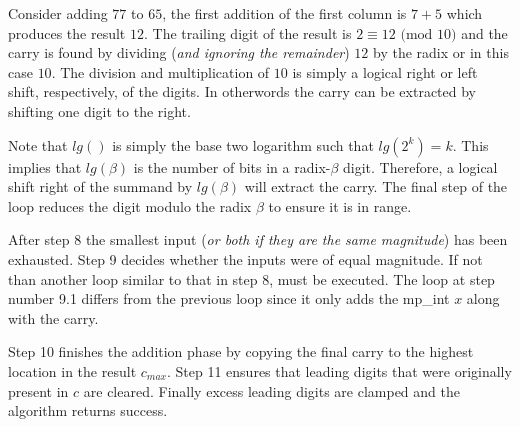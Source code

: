 \documentclass[b5paper]{book}
\begin{document}
Consider adding $77$ to $65$, the first addition of the first column is $7 + 5$ which produces the result $12$.  The trailing digit of the result
is $2 \equiv 12 \mbox{ (mod }10\mbox{)}$ and the carry is found by dividing (\textit{and ignoring the remainder}) $12$ by the radix or in this case $10$.  The
division and multiplication of $10$ is simply a logical right or left shift, respectively, of the digits.  In otherwords the carry can be extracted
by shifting one digit to the right.

Note that $lg()$ is simply the base two logarithm such that $lg(2^k) = k$.  This implies that $lg(\beta)$ is the number of bits in a radix-$\beta$ 
digit.  Therefore, a logical shift right of the summand by $lg(\beta)$ will extract the carry.  The final step of the loop reduces the digit 
modulo the radix $\beta$ to ensure it is in range.

After step 8 the smallest input (\textit{or both if they are the same magnitude}) has been exhausted.  Step 9 decides whether
the inputs were of equal magnitude.  If not than another loop similar to that in step 8, must be executed.  The loop at step
number 9.1 differs from the previous loop since it only adds the mp\_int $x$ along with the carry.  

Step 10 finishes the addition phase by copying the final carry to the highest location in the result $c_{max}$.  Step 11 ensures that 
leading digits that were originally present in $c$ are cleared.  Finally excess leading digits are clamped and the algorithm returns success.
\end{document}

